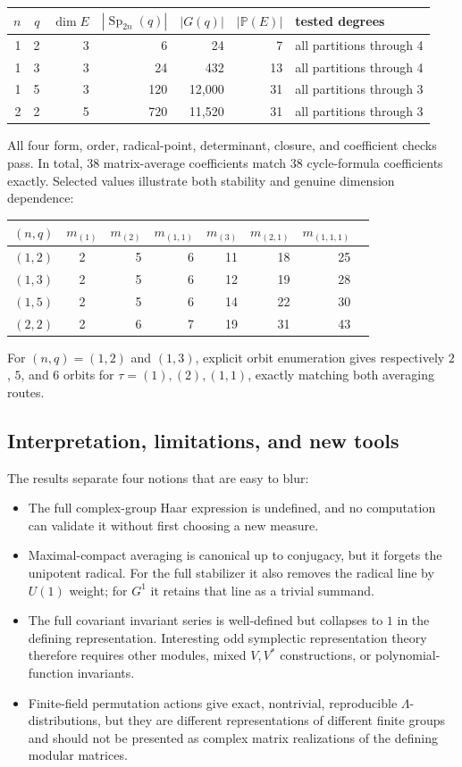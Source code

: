 \documentclass[10pt]{article}
\newcommand{\Sp}{\operatorname{Sp}}
\begin{document}
\begin{center}
\begin{tabularx}{\linewidth}{@{}rrrrrrX@{}}
\toprule
$n$ & $q$ & $\dim E$ & $|\Sp_{2n}(q)|$ & $|G(q)|$ & $|\mathbb P(E)|$ & tested degrees\\
\midrule
1&2&3&6&24&7&all partitions through 4\\
1&3&3&24&432&13&all partitions through 4\\
1&5&3&120&12,000&31&all partitions through 3\\
2&2&5&720&11,520&31&all partitions through 3\\
\bottomrule
\end{tabularx}
\end{center}
All four form, order, radical-point, determinant, closure, and coefficient
checks pass. In total, 38 matrix-average coefficients match 38 cycle-formula
coefficients exactly. Selected values illustrate both stability and genuine
dimension dependence:
\begin{center}
\begin{tabular}{@{}ccrrrrrr@{}}
\toprule
$(n,q)$ & $m_{(1)}$ & $m_{(2)}$ & $m_{(1,1)}$ & $m_{(3)}$ & $m_{(2,1)}$ & $m_{(1,1,1)}$\\
\midrule
$(1,2)$&2&5&6&11&18&25\\
$(1,3)$&2&5&6&12&19&28\\
$(1,5)$&2&5&6&14&22&30\\
$(2,2)$&2&6&7&19&31&43\\
\bottomrule
\end{tabular}
\end{center}
For $(n,q)=(1,2)$ and $(1,3)$, explicit orbit enumeration gives respectively
$2$, $5$, and $6$ orbits for $\tau=(1),(2),(1,1)$, exactly matching both
averaging routes.

\subsection{Interpretation, limitations, and new tools}

The results separate four notions that are easy to blur:
\begin{itemize}[leftmargin=*,itemsep=3pt]
\item The full complex-group Haar expression is undefined, and no computation
can validate it without first choosing a new measure.
\item Maximal-compact averaging is canonical up to conjugacy, but it forgets
the unipotent radical. For the full stabilizer it also removes the radical
line by $U(1)$ weight; for $G^1$ it retains that line as a trivial summand.
\item The full covariant invariant series is well-defined but collapses to $1$
in the defining representation. Interesting odd symplectic representation
theory therefore requires other modules, mixed $V,V^*$ constructions, or
polynomial-function invariants.
\item Finite-field permutation actions give exact, nontrivial, reproducible
$\Lambda$-distributions, but they are different representations of different
finite groups and should not be presented as complex matrix realizations of
the defining modular matrices.
\end{itemize}
\end{document}
